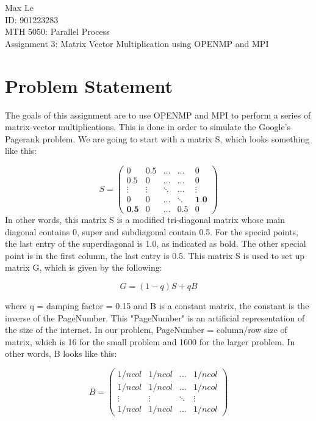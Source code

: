 \documentclass[12pt]{article}
\begin{document}
	\begin{flushleft}
		Max Le \\
		ID: 901223283\\
		MTH 5050: Parallel Process\\
		Assignment 3: Matrix Vector Multiplication using OPENMP and MPI  
    \end{flushleft}


    \section{Problem Statement}

    The goals of this assignment are to use OPENMP and MPI to perform a series of matrix-vector multiplications. This is done in order to simulate the Google's Pagerank problem. We are going to start with a matrix S, which looks something like this: 

    \[
        S = \begin{pmatrix}
        0 & 0.5 & \dots & \dots & 0 \\
        0.5 & 0 & \dots & \dots & 0 \\
        \vdots & \vdots & \ddots & \dots & \vdots \\
        0 & 0 & \dots &  \ddots &\textbf{1.0} \\
        \textbf{0.5} & 0  & \dots & 0.5 & 0
        \end{pmatrix}
    \]
    \noindent
    In other words, this matrix S is a modified tri-diagonal matrix whose main diagonal contains 0, super and subdiagonal contain  0.5.  For the special points, the last entry of the superdiagonal is 1.0, as indicated as bold. The other special point is in the first column, the last entry is 0.5. This matrix S is used to set up matrix G, which is given by the following: 

    \begin{equation}
        G = (1-q)S + qB
    \end{equation}

    \noindent
    where q = damping factor = 0.15 and B is a constant matrix, the constant is the inverse of the PageNumber.  This "PageNumber" is an artificial representation of the size of the internet. In our problem, PageNumber = column/row size of matrix, which is 16 for the small problem and 1600 for the larger problem. In other words, B looks like this: 

    \[
        B = \begin{pmatrix}
          1/ncol & 1/ncol & \dots & 1/ncol \\
          1/ncol & 1/ncol & \dots & 1/ncol \\
          \vdots & \vdots & \ddots & \vdots \\
          1/ncol & 1/ncol & \dots & 1/ncol
        \end{pmatrix}
    \]
\end{document}
